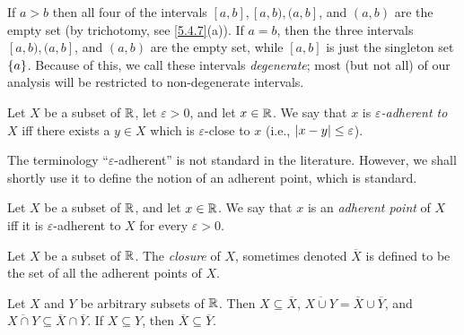 \begin{eg}\label{9.1.4}
  If \(a > b\) then all four of the intervals \([a, b], [a, b), (a, b]\), and \((a, b)\) are the empty set (by trichotomy, see \cref{5.4.7}(a)).
  If \(a = b\), then the three intervals \([a, b), (a, b]\), and \((a, b)\) are the empty set, while \([a, b]\) is just the singleton set \(\left\lbrace a\right\rbrace\).
  Because of this, we call these intervals \emph{degenerate};
  most (but not all) of our analysis will be restricted to non-degenerate intervals.
\end{eg}

\begin{defn}\label{9.1.5}
  Let \(X\) be a subset of \(\mathbb{R}\), let \(\varepsilon > 0\), and let \(x \in \mathbb{R}\).
  We say that \(x\) is \emph{\(\varepsilon\)-adherent to \(X\)} iff there exists a \(y \in X\) which is \(\varepsilon\)-close to \(x\)
  (i.e., \(\left\lvert x - y\right\rvert \leq \varepsilon\)).
\end{defn}

\begin{rmk}\label{9.1.6}
  The terminology ``\(\varepsilon\)-adherent'' is not standard in the literature.
  However, we shall shortly use it to define the notion of an adherent point, which is standard.
\end{rmk}

\setcounter{thm}{7}
\begin{defn}\label{9.1.8}
  Let \(X\) be a subset of \(\mathbb{R}\), and let \(x \in \mathbb{R}\).
  We say that \(x\) is an \emph{adherent point} of \(X\) iff it is \(\varepsilon\)-adherent to \(X\) for every \(\varepsilon > 0\).
\end{defn}

\setcounter{thm}{9}
\begin{defn}[Closure]\label{9.1.10}
  Let \(X\) be a subset of \(\mathbb{R}\).
  The \emph{closure} of \(X\), sometimes denoted \(\overline{X}\) is defined to be the set of all the adherent points of \(X\).
\end{defn}

\begin{lem}\label{9.1.11}
  Let \(X\) and \(Y\) be arbitrary subsets of \(\mathbb{R}\).
  Then \(X \subseteq \overline{X}\), \(\overline{X \cup Y} = \overline{X} \cup \overline{Y}\), and \(\overline{X \cap Y} \subseteq \overline{X} \cap \overline{Y}\).
  If \(X \subseteq Y\), then \(\overline{X} \subseteq \overline{Y}\).
\end{lem}

